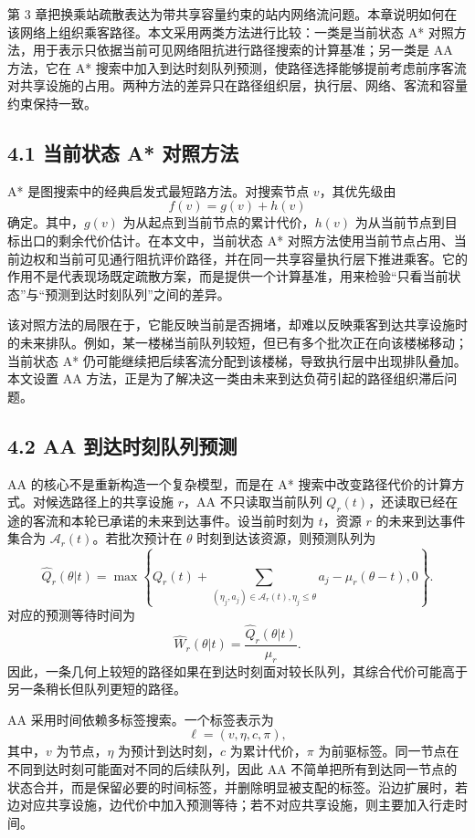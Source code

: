 \documentclass[UTF8,a4paper,12pt]{ctexart}
\begin{document}
第 3 章把换乘站疏散表达为带共享容量约束的站内网络流问题。本章说明如何在该网络上组织乘客路径。本文采用两类方法进行比较：一类是当前状态 A* 对照方法，用于表示只依据当前可见网络阻抗进行路径搜索的计算基准；另一类是 AA 方法，它在 A* 搜索中加入到达时刻队列预测，使路径选择能够提前考虑前序客流对共享设施的占用。两种方法的差异只在路径组织层，执行层、网络、客流和容量约束保持一致。

\subsection{4.1 当前状态 A* 对照方法}

A* 是图搜索中的经典启发式最短路方法。对搜索节点 \(v\)，其优先级由
\[
f(v)=g(v)+h(v)
\]
确定。其中，\(g(v)\) 为从起点到当前节点的累计代价，\(h(v)\) 为从当前节点到目标出口的剩余代价估计。在本文中，当前状态 A* 对照方法使用当前节点占用、当前边权和当前可见通行阻抗评价路径，并在同一共享容量执行层下推进乘客。它的作用不是代表现场既定疏散方案，而是提供一个计算基准，用来检验“只看当前状态”与“预测到达时刻队列”之间的差异。

该对照方法的局限在于，它能反映当前是否拥堵，却难以反映乘客到达共享设施时的未来排队。例如，某一楼梯当前队列较短，但已有多个批次正在向该楼梯移动；当前状态 A* 仍可能继续把后续客流分配到该楼梯，导致执行层中出现排队叠加。本文设置 AA 方法，正是为了解决这一类由未来到达负荷引起的路径组织滞后问题。

\subsection{4.2 AA 到达时刻队列预测}

AA 的核心不是重新构造一个复杂模型，而是在 A* 搜索中改变路径代价的计算方式。对候选路径上的共享设施 \(r\)，AA 不只读取当前队列 \(Q_r(t)\)，还读取已经在途的客流和本轮已承诺的未来到达事件。设当前时刻为 \(t\)，资源 \(r\) 的未来到达事件集合为 \(\mathcal A_r(t)\)。若批次预计在 \(\theta\) 时刻到达该资源，则预测队列为
\[
\widehat Q_r(\theta|t)=
\max\left\{
Q_r(t)+
\sum_{(\eta_j,a_j)\in\mathcal A_r(t),\eta_j\leq \theta}a_j
-\mu_r(\theta-t),0
\right\}.
\]
对应的预测等待时间为
\[
\widehat W_r(\theta|t)=\frac{\widehat Q_r(\theta|t)}{\mu_r}.
\]
因此，一条几何上较短的路径如果在到达时刻面对较长队列，其综合代价可能高于另一条稍长但队列更短的路径。

AA 采用时间依赖多标签搜索。一个标签表示为
\[
\ell=(v,\eta,c,\pi),
\]
其中，\(v\) 为节点，\(\eta\) 为预计到达时刻，\(c\) 为累计代价，\(\pi\) 为前驱标签。同一节点在不同到达时刻可能面对不同的后续队列，因此 AA 不简单把所有到达同一节点的状态合并，而是保留必要的时间标签，并删除明显被支配的标签。沿边扩展时，若边对应共享设施，边代价中加入预测等待；若不对应共享设施，则主要加入行走时间。
\end{document}
